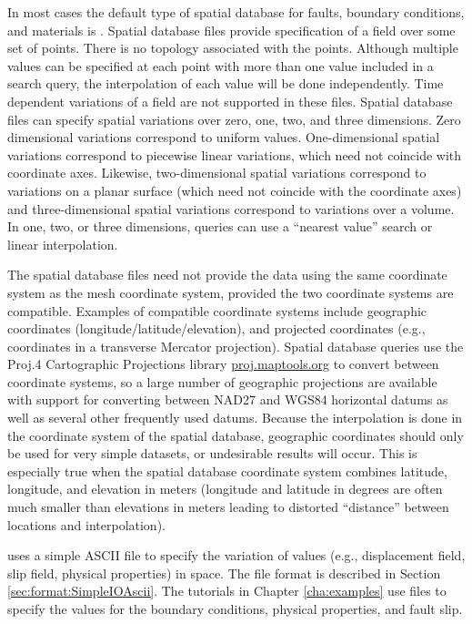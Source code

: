 In most cases the default type of spatial database for faults, boundary
conditions, and materials is . Spatial database files
provide specification of a field over some set of points. There is
no topology associated with the points. Although multiple values can
be specified at each point with more than one value included in a
search query, the interpolation of each value will be done independently.
Time dependent variations of a field are not supported in these files.
Spatial database files can specify spatial variations over zero, one,
two, and three dimensions. Zero dimensional variations correspond
to uniform values. One-dimensional spatial variations correspond to
piecewise linear variations, which need not coincide with coordinate
axes. Likewise, two-dimensional spatial variations correspond to variations
on a planar surface (which need not coincide with the coordinate axes)
and three-dimensional spatial variations correspond to variations
over a volume. In one, two, or three dimensions, queries can use a
``nearest value'' search or linear interpolation.

The spatial database files need not provide the data using the same
coordinate system as the mesh coordinate system, provided the two
coordinate systems are compatible. Examples of compatible coordinate
systems include geographic coordinates (longitude/latitude/elevation),
and projected coordinates (e.g., coordinates in a transverse Mercator
projection). Spatial database queries use the Proj.4 Cartographic
Projections library \url{proj.maptools.org} to convert between coordinate
systems, so a large number of geographic projections are available
with support for converting between NAD27 and WGS84 horizontal datums
as well as several other frequently used datums. Because the interpolation
is done in the coordinate system of the spatial database, geographic
coordinates should only be used for very simple datasets, or undesirable
results will occur. This is especially true when the spatial database
coordinate system combines latitude, longitude, and elevation in meters
(longitude and latitude in degrees are often much smaller than elevations
in meters leading to distorted ``distance'' between locations and
interpolation).

 uses a simple ASCII file to specify the variation of values (e.g., displacement field, slip field, physical properties) in space.  The file format is described in Section \vref{sec:format:SimpleIOAscii}.  The tutorials in Chapter \vref{cha:examples} use  files to specify the values for the boundary conditions, physical properties, and fault slip.

